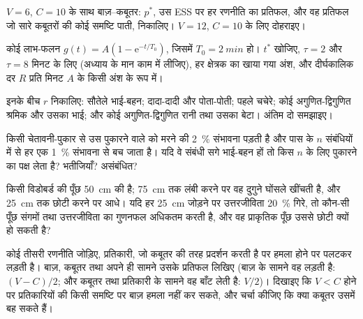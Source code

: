 \begin{exercise}[$\star\star$]\label{exo:b3:behavioural-ecology:5}
$V = 6$, $C = 10$ के साथ बाज़--कबूतर: $p^{*}$, उस ESS पर हर रणनीति का
प्रतिफल, और वह प्रतिफल जो सारे कबूतरों की कोई समष्टि पाती, निकालिए।
$V = 12$, $C = 10$ के लिए दोहराइए।
\end{exercise}

\begin{exercise}[$\star\star$]\label{exo:b3:behavioural-ecology:6}
कोई लाभ-फलन $g(t) = A(1 - \mathrm{e}^{-t/T_{0}})$, जिसमें $T_{0} =
\qty{2}{min}$ हो। $t^{*}$ खोजिए, $\tau = 2$ और $\tau = 8$ मिनट के लिए
(अध्याय के मान काम में लीजिए), हर क्षेत्रक का खाया गया अंश, और
दीर्घकालिक दर $R$ प्रति मिनट $A$ के किसी अंश के रूप में।
\end{exercise}

\begin{exercise}[$\star\star$]\label{exo:b3:behavioural-ecology:7}
इनके बीच $r$ निकालिए: सौतेले भाई-बहन; दादा-दादी और पोता-पोती; पहले
चचेरे; कोई अगुणित-द्विगुणित श्रमिक और उसका भाई; और कोई
अगुणित-द्विगुणित रानी तथा उसका बेटा। अंतिम दो समझाइए।
\end{exercise}

\begin{exercise}[$\star\star$]\label{exo:b3:behavioural-ecology:8}
किसी चेतावनी-पुकार से उस पुकारने वाले को मरने की \qty{2}{\%} संभावना
पड़ती है और पास के $n$ संबंधियों में से हर एक \qty{1}{\%} संभावना से बच
जाता है। यदि वे संबंधी सगे भाई-बहन हों तो किस $n$ के लिए  पुकारने का पक्ष लेता है? भतीजियाँ? असंबंधित?
\end{exercise}

\begin{exercise}[$\star\star$]\label{exo:b3:behavioural-ecology:9}
किसी विडोबर्ड की पूँछ \qty{50}{cm} की है; \qty{75}{cm} तक लंबी करने पर
वह दुगुने घोंसले खींचती है, और \qty{25}{cm} तक छोटी करने पर आधे। यदि हर
\qty{25}{cm} जोड़ने पर उत्तरजीविता \qty{20}{\%} गिरे, तो कौन-सी पूँछ
संगमों तथा उत्तरजीविता का गुणनफल अधिकतम करती है, और वह प्राकृतिक पूँछ
उससे छोटी क्यों हो सकती है?
\end{exercise}

\begin{exercise}[$\star\star\star$]\label{exo:b3:behavioural-ecology:10}
कोई तीसरी रणनीति जोड़िए, प्रतिकारी, जो कबूतर की तरह प्रदर्शन करती है पर
हमला होने पर पलटकर लड़ती है। बाज़, कबूतर तथा अपने ही सामने उसके प्रतिफल
लिखिए (बाज़ के सामने वह लड़ती है: $(V - C)/2$; और कबूतर तथा प्रतिकारी
के सामने वह बाँट लेती है: $V/2$)। दिखाइए कि $V < C$ होने पर प्रतिकारियों
की किसी समष्टि पर बाज़ हमला नहीं कर सकते, और चर्चा कीजिए कि क्या कबूतर
उसमें बह सकते हैं।
\end{exercise}

